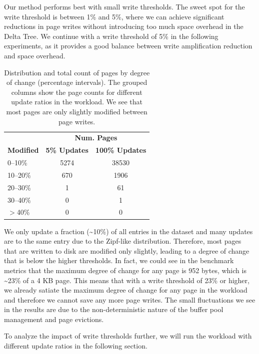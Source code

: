 Our method performs best with small write thresholds.
The sweet spot for the write threshold is between 1\% and 5\%, where we can achieve significant reductions in page writes without introducing too much space overhead in the Delta Tree.
We continue with a write threshold of 5\% in the following experiments, as it provides a good balance between write amplification reduction and space overhead.

\begin{table}[ht]
  \centering
    \begin{tabular}{l|cc}
    \toprule
    & \multicolumn{2}{c}{\textbf{Num. Pages}} \\
    \cmidrule(lr){2-3}
    \textbf{Modified} & \textbf{5\% Updates} & \textbf{100\% Updates} \\
    \midrule
    0--10\%   & 5274 &  38530\\
    10--20\%  & 670 & 1906\\
    20--30\%  & 1 & 61 \\
    30--40\%  & 0 & 1 \\
    $>$40\%  & 0 & 0 \\
    \bottomrule
  \end{tabular}
  \caption{Distribution and total count of pages by degree of change (percentage intervals). The grouped columns show the page counts for different update ratios in the workload. We see that most pages are only slightly modified between page writes.}
  \label{tab:modification-degree}
\end{table}

We only update a fraction (\textasciitilde10\%) of all entries in the dataset and many updates are to the same entry due to the Zipf-like distribution.
Therefore, most pages that are written to disk are modified only slightly, leading to a degree of change that is below the higher thresholds.
In fact, we could see in the benchmark metrics that the maximum degree of change for any page is 952 bytes, which is \textasciitilde23\% of a 4 KB page.
This means that with a write threshold of 23\% or higher, we already satiate the maximum degree of change for any page in the workload and therefore we cannot save any more page writes.
The small fluctuations we see in the results are due to the non-deterministic nature of the buffer pool management and page evictions.

To analyze the impact of write thresholds further, we will run the workload with different update ratios in the following section.

